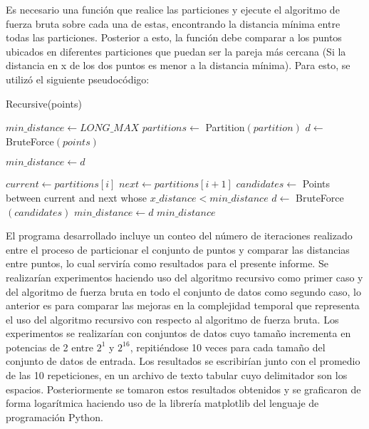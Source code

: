 Es necesario una función que realice las particiones y ejecute el algoritmo de fuerza bruta sobre cada una de estas, encontrando la distancia mínima entre todas las particiones. Posterior a esto, la función debe comparar a los puntos ubicados en diferentes particiones que puedan ser la pareja más cercana (Si la distancia en x de los dos puntos es menor a la distancia mínima). Para esto, se utilizó el siguiente pseudocódigo:

\begin{algorithm}[H]	%
	\caption{Recursive(points)}	%
	\begin{algorithmic}
	    \STATE $min\_distance \gets LONG\_MAX$
	    \STATE $partitions \gets$ Partition$(partition)$
	        \STATE $d \gets$ BruteForce$(points)$
	        
	            \STATE $min\_distance \gets d$
	        \ENDIF
	    \ENDFOR
	    
	        \STATE $current \gets partitions[i]$
	        \STATE $next \gets partitions[i + 1]$
	        \STATE $candidates \gets$ Points between current and next whose $x\_distance < min\_distance$
	        \STATE $d \gets$ BruteForce$(candidates)$
	            \STATE $min\_distance \gets d$
	        \ENDIF
	    \ENDFOR
    \RETURN $min\_distance$
	\end{algorithmic}
	\label{algo:factorial}	%
\end{algorithm}

El programa desarrollado incluye un conteo del número de iteraciones realizado entre el proceso de particionar el conjunto de puntos y comparar las distancias entre puntos, lo cual serviría como resultados para el presente informe. Se realizarían experimentos haciendo uso del algoritmo recursivo como primer caso y del algoritmo de fuerza bruta en todo el conjunto de datos como segundo caso, lo anterior es para comparar las mejoras en la complejidad temporal que representa el uso del algoritmo recursivo con respecto al algoritmo de fuerza bruta. Los experimentos se realizarían con conjuntos de datos cuyo tamaño incrementa en potencias de 2 entre $2^1$ y $2^16$, repitiéndose 10 veces para cada tamaño del conjunto de datos de entrada. Los resultados se escribirían junto con el promedio de las 10 repeticiones, en un archivo de texto tabular cuyo delimitador son los espacios. Posteriormente se tomaron estos resultados obtenidos y se graficaron de forma logarítmica haciendo uso de la librería matplotlib del lenguaje de programación Python.